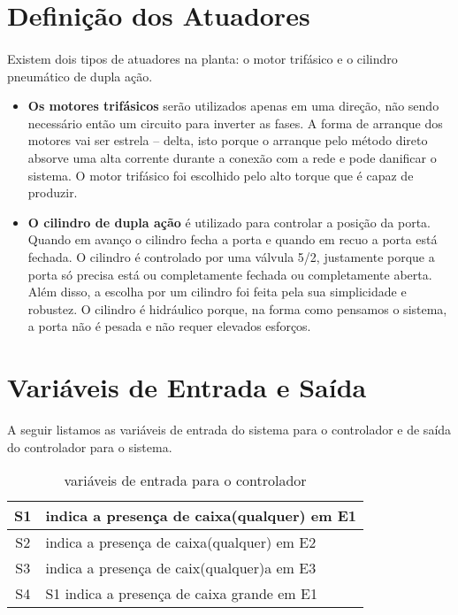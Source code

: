\section{Definição dos Atuadores}
\paragraph{}Existem dois tipos de atuadores na planta: o motor trifásico e o cilindro pneumático de dupla ação.
\begin{itemize}
\item \textbf{Os motores trifásicos} serão utilizados apenas em uma direção, não sendo necessário então um circuito para inverter as fases. A forma de arranque dos motores vai ser estrela – delta, isto porque o arranque pelo método direto absorve uma alta corrente durante a conexão com a rede e pode danificar o sistema. O motor trifásico foi escolhido pelo alto torque que é capaz de produzir.

\item \textbf{O cilindro de dupla ação} é utilizado para controlar a posição da porta. Quando em avanço o cilindro fecha a porta e quando
em recuo a porta está fechada. O cilindro é controlado por uma válvula 5/2, justamente porque a porta só precisa está ou completamente
fechada ou completamente aberta. Além disso, a escolha por um cilindro foi feita pela sua simplicidade e robustez. O cilindro é hidráulico porque, na forma como pensamos o sistema, a porta não é pesada e não requer elevados esforços.
\end{itemize}

\section{Variáveis de Entrada e Saída}
A seguir listamos as variáveis de entrada do sistema para o controlador e de saída do controlador para o sistema.
\begin{table}[H]
	\centering 
	\begin{tabular}{|c|l|}\hline
	S1 &  indica a presença de caixa(qualquer) em E1 \\ \hline
	S2 &  indica a presença de caixa(qualquer) em E2 \\ \hline		
	S3 &  indica a presença de caix(qualquer)a em E3 \\ \hline		
	S4 & S1 indica a presença de caixa grande em E1 \\ \hline	
	\end{tabular}
	\caption{variáveis de entrada para o controlador}
\end{table}

